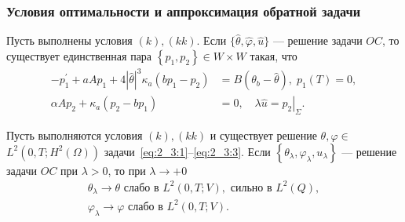 \begin{frame}
    \frametitle{Условия оптимальности и аппроксимация обратной задачи}


    \begin{theorem}[2.7]
        \label{th:2_3:2}
        Пусть выполнены условия $(k), (kk)$.
        Если $\{\widehat{\theta}, \widehat{\varphi}, \widehat{u}\}$ — решение задачи $OC$,
        то существует единственная пара $\left\{p_ {1}, p_{2}\right\} \in W \times W$ такая, что
        \begin{equation}
            \label{eq:2_3:15}
            \begin{aligned}
                -p_{1}^{\prime}+a A p_{1}+4|\widehat{\theta}|^{3} \kappa_{a}\left(b p_{1}
                -p_{2}\right)&=B\left(\theta_{b}-\widehat{\theta}\right), \;
                p_{1}(T)=0, \\
                \alpha A p_{2}+\kappa_{a}\left(p_{2}-b p_{1}\right)&=0,
                \quad \lambda \widehat{u}=\left.p_{2}\right|_{\Sigma}.
            \end{aligned}
        \end{equation}
    \end{theorem}

    \begin{theorem}[2.8]
        \label{th:2_3:3}
        Пусть выполняются условия $(k), (kk)$ и существует решение
        $\theta, \varphi \in$ $L^{2}\left(0, T ; H^{2}(\Omega) \right)$
        задачи~\eqref{eq:2_3:1}--\eqref{eq:2_3:3}.
        Если $\left\{\theta_{\lambda}, \varphi_{\lambda}, u_{\lambda}\right\}$
        — решение задачи $OC$ при $\lambda>0$, то при $\lambda\rightarrow+0$
        \[
            \begin{gathered}
                \theta_{\lambda} \rightarrow \theta \text { слабо в } L^{2}(0, T ; V),
                \text { сильно в } L^{2}(Q), \\
                \varphi_{\lambda} \rightarrow \varphi \text { слабо в } L^{2}(0, T ; V).
            \end{gathered}
        \]
    \end{theorem}
\end{frame}

